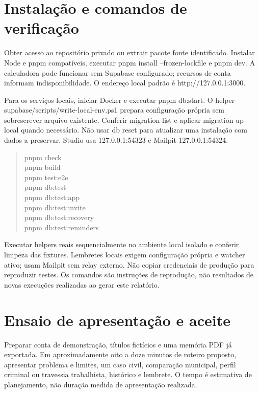 \section{Instalação e comandos de verificação}
\label{section-D-2}
Obter acesso ao repositório privado ou extrair pacote fonte identificado. Instalar Node e pnpm compatíveis, executar pnpm install --frozen-lockfile e pnpm dev. A calculadora pode funcionar sem Supabase configurado; recursos de conta informam indisponibilidade. O endereço local padrão é http://127.0.0.1:3000.

Para os serviços locais, iniciar Docker e executar pnpm db:start. O helper supabase/scripts/write-local-env.ps1 prepara configuração própria sem sobrescrever arquivo existente. Conferir migration list e aplicar migration up --local quando necessário. Não usar db reset para atualizar uma instalação com dados a preservar. Studio usa 127.0.0.1:54323 e Mailpit 127.0.0.1:54324.

\begin{quote}\begin{singlespace}\raggedright\ttfamily\footnotesize
\hspace*{0.0em}pnpm check\\
\hspace*{0.0em}pnpm build\\
\hspace*{0.0em}pnpm test:e2e\\
\hspace*{0.0em}pnpm db:test\\
\hspace*{0.0em}pnpm db:test:app\\
\hspace*{0.0em}pnpm db:test:invite\\
\hspace*{0.0em}pnpm db:test:recovery\\
\hspace*{0.0em}pnpm db:test:reminders\\
\end{singlespace}\end{quote}
Executar helpers reais sequencialmente no ambiente local isolado e conferir limpeza das fixtures. Lembretes locais exigem configuração própria e watcher ativo; usam Mailpit sem relay externo. Não copiar credenciais de produção para reproduzir testes. Os comandos são instruções de reprodução, não resultados de novas execuções realizadas ao gerar este relatório.

\section{Ensaio de apresentação e aceite}
\label{section-D-3}
Preparar conta de demonstração, títulos fictícios e uma memória PDF já exportada. Em aproximadamente oito a doze minutos de roteiro proposto, apresentar problema e limites, um caso civil, comparação municipal, perfil criminal ou travessia trabalhista, histórico e lembrete. O tempo é estimativa de planejamento, não duração medida de apresentação realizada.

